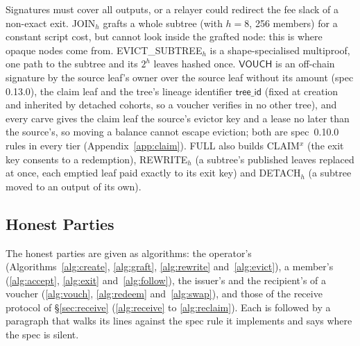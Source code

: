 \documentclass[runningheads]{llncs}
\newcommand{\tr}[1]{\textsf{#1}}
\newcommand{\iface}[1]{\ensuremath{\mathsf{#1}}}
\begin{document}
Signatures must cover all outputs, or a relayer could redirect the fee
slack of a non-exact exit. \tr{JOIN}$_h$ grafts a whole subtree (with
$h = 8$, 256 members) for a constant script cost, but cannot look inside
the grafted node: this is where opaque nodes come from.
\tr{EVICT\_SUBTREE}$_h$ is a shape-specialised multiproof, one path to the
subtree and its $2^h$ leaves hashed once. \iface{VOUCH} is an off-chain
signature by the source leaf's owner over the source leaf without its
amount (spec 0.13.0), the claim leaf and the tree's lineage identifier $\mathsf{tree\_id}$ (fixed at creation
and inherited by detached cohorts, so a voucher verifies in no other
tree), and every carve gives the claim leaf the source's evictor key and
a lease no later than the source's, so moving a balance cannot escape
eviction; both are spec~0.10.0 rules in every tier
(Appendix~\ref{app:claim}). FULL also builds \tr{CLAIM}$^{x}$ (the exit
key consents to a redemption), \tr{REWRITE}$_h$ (a subtree's published
leaves replaced at once, each emptied leaf paid exactly to its exit key)
and \tr{DETACH}$_h$ (a subtree moved to an output of its own).

\predNotation
\predExit
\predJoin
\predUpdate
\predClaim
\predEvict
\predRewrite
\predDetach
\predReclaim

\subsection{Honest Parties}\label{sec:parties}

The honest parties are given as algorithms: the operator's
(Algorithms~\ref{alg:create}, \ref{alg:graft}, \ref{alg:rewrite}
and~\ref{alg:evict}), a member's (\ref{alg:accept}, \ref{alg:exit}
and~\ref{alg:follow}), the issuer's and the recipient's of a voucher
(\ref{alg:vouch}, \ref{alg:redeem} and~\ref{alg:swap}), and those of the
receive protocol of \S\ref{sec:receive} (\ref{alg:receive} to
\ref{alg:reclaim}). Each is followed by a paragraph that walks its lines
against the spec rule it implements and says where the spec is silent.
\end{document}
